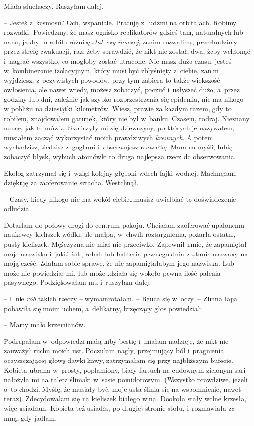 \documentclass[oneside,polish,11pt,sfheadings]{mwbk}
\begin{document}
Miała słuchaczy. Ruszyłam dalej.

-- Jesteś z~kosmosu? Och, wspaniale. Pracuję z~ludźmi na orbitalach.
Robimy rozwałki. Powiedzmy, że masz ognisko replikatorów gdzieś tam,
naturalnych lub nano, jakby to robiło różnicę\ldots  \textit{tak czy inaczej},
zanim rozwalimy, przechodzimy przez strefę ewakuacji, raz, żeby
sprawdzić, że nikt nie został, dwa, żeby wchłonąć i~nagrać wszystko, co
mogłoby zostać utracone. Nie masz dużo czasu, jesteś w~kombinezonie
izolacyjnym, który musi być zbłyśnięty z~ciebie, zanim wyjdziesz, z~oczywistych powodów, przy tym zabiera to także większość owłosienia, ale
nawet wtedy, możesz zobaczyć, poczuć i~usłyszeć dużo, a~przez godziny
lub dni, zależnie jak szybko rozprzestrzenia się epidemia, nie ma nikogo
w pobliżu na dziesiątki kilometrów. Wiesz, prawie za każdym razem, gdy
to robiłem, znajdowałem gatunek, który nie był w~banku. Czasem, rodzaj.
Nieznany nauce, jak to mówią. Skończyły mi się dziewczyny, po których je
nazywałem, musiałem zacząć wykorzystać moich prawdziwych
\textit{krewnych}. A potem wychodzisz, siedzisz z~goglami i~obserwujesz
rozwałkę. Mam na myśli, lubię zobaczyć błysk, wybuch atomówki to druga
najlepsza rzecz do obserwowania.

Ekolog zatrzymał się i~wziął kolejny głęboki wdech fajki wodnej.
Machnęłam, dziękuję za zaoferowanie sztacha. Westchnął.

-- Czasy, kiedy nikogo nie ma wokół ciebie\ldots  musisz uwielbiać to
doświadczenie odludzia.

Dotarłam do połowy drogi do centrum pokoju. Chciałam zaoferować
upalonemu naukowcy kieliszek wódki, ale małpa, w~chwili roztargnienia,
pożarła ostatni, pusty kieliszek. Mężczyzna nie miał nic przeciwko.
Zapewnił mnie, że zapamiętał moje nazwisko i~jakiś żuk, robak lub
bakteria pewnego dnia zostanie nazwany na moją cześć. Zdałam sobie
sprawę, że nie zapamiętałabym jego nazwiska. Lub może nie powiedział mi,
lub może\ldots  działa się wokoło pewna ilość palenia pasywnego.
Podziękowałam mu i~ruszyłam dalej.

-- I~nie \textit{rób} takich rzeczy -- wymamrotałam. -- Rzuca się w~oczy. -- Zimna łapa pobawiła się moim uchem, a~delikatny, brzęczący głos
powiedział:

-- Mamy mało krzemianów.

Podrapałam w~odpowiedzi małą niby-bestię i~miałam nadzieję, że nikt nie
zauważył ruchu moich ust. Poczułam nagły, przejmujący ból i~pragnienia
oczyszczającej głowę dawki kawy, zatrzymałam się przy najbliższym
bufecie. Kobieta ubrana w~prosty, poplamiony, biały fartuch na cudownym
zielonym sari nałożyła mi na talerz ślimaki w~sosie pomidorowym.
(Wszystko prawdziwe, jeżeli o~to chodzi. Myślę, że musiały być, moje
usta ślinią się na wspomnienie, nawet teraz). Zdecydowałam się na
kieliszek białego wina. Dookoła stały wolne krzesła, więc usiadłam.
Kobieta też usiadła, po drugiej stronie stołu, i~rozmawiała ze mną, gdy
jadłam.
\end{document}
